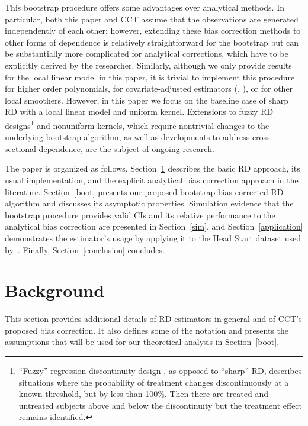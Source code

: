 \documentclass[12pt,fleqn]{article}
\begin{document}
This bootstrap procedure offers some advantages over analytical methods.  In
particular, both this paper and CCT assume that the observations are generated
independently of each other; however, extending these bias correction methods to
other forms of dependence is relatively straightforward for the bootstrap but
can be substantially more complicated for analytical
corrections, which have to be explicitly derived by the researcher. Similarly,
although we only provide results for the local linear model in this paper, it is
trivial to implement this procedure for higher order polynomials, for
covariate-adjusted estimators (\citealp{frolich2007}, \citealp{calonico2015}),
or for other local smoothers. \citep{loader2006} However, in this paper we focus
on the baseline case of sharp RD with a local linear model and uniform
kernel. Extensions to fuzzy RD designs\footnote{%
  ``Fuzzy'' regression discontinuity design \citep{HTV2001}, as opposed to
  ``sharp'' RD, describes situations where the probability of treatment changes
  discontinuously at a known threshold, but by less than 100\%. Then there are
  treated and untreated subjects above and below the discontinuity but the
  treatment effect remains identified.} %
and nonuniform kernels, which require nontrivial changes to the underlying
bootstrap algorithm, as well as developments to address cross sectional
dependence, are the subject of ongoing research.

The paper is organized as follows. Section~\ref{background} describes the basic
RD approach, its usual implementation, and the explicit analytical bias
correction approach in the literature. Section~\ref{boot} presents our proposed
bootstrap bias corrected RD algorithm and discusses its asymptotic
properties. Simulation evidence that the bootstrap procedure provides valid CIs
and its relative performance to the analytical bias correction are presented in
Section~\ref{sim}, and Section~\ref{application} demonstrates the estimator's
usage by applying it to the Head Start dataset used by~\cite{ludwig2007}.
Finally, Section~\ref{conclusion} concludes.

\section{Background}\label{background}

This section provides additional details of RD estimators in general and of
CCT's proposed bias correction. It also defines some of the notation and
presents the assumptions that will be used for our theoretical analysis in
Section~\ref{boot}.
\end{document}
